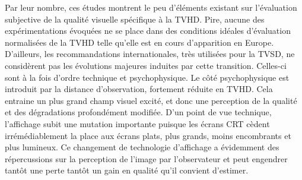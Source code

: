 Par leur nombre, ces études montrent le peu d'éléments existant sur l'évaluation subjective de la qualité visuelle spécifique à la TVHD. Pire, aucune des expérimentations évoquées ne se place dans des conditions idéales d'évaluation normalisées de la TVHD telle qu'elle est en cours d'apparition en Europe. D'ailleurs, les recommandations internationales, très utilisées pour la TVSD, ne considèrent pas les évolutions majeures induites par cette transition. Celles-ci sont à la fois d'ordre technique et psychophysique. Le côté psychophysique est introduit par la distance d'observation, fortement réduite en TVHD. Cela entraine un plus grand champ visuel excité, et donc une perception de la qualité et des dégradations profondément modifiée. D'un point de vue technique, l'affichage subit une mutation importante puisque les écrans CRT cèdent irrémédiablement la place aux écrans plats, plus grands, moins encombrants et plus lumineux. Ce changement de technologie d'affichage a évidemment des répercussions sur la perception de l'image par l'observateur et peut engendrer tantôt une perte tantôt un gain en qualité qu'il convient d'estimer.


\ornementChapitre
